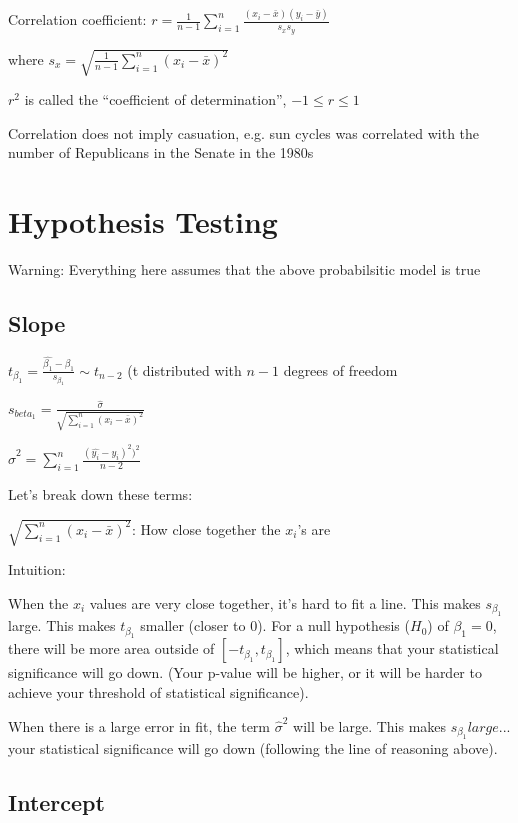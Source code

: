 \documentclass[twoside]{article}
\begin{document}
Correlation coefficient: $r = \frac{1}{n-1}\sum\limits_{i=1}^{n}\frac{(x_i - \bar{x})(y_i-\bar{y})}{s_x s_y}$

where $s_x = \sqrt{\frac{1}{n-1} \sum\limits_{i=1}^n(x_i-\bar{x})^2}$

$r^2$ is called the ``coefficient of determination'', $-1 \leq r \leq 1$

Correlation does not imply casuation, e.g. sun cycles was correlated with the number of Republicans in the Senate in the 1980s

\section{Hypothesis Testing}

Warning: Everything here assumes that the above probabilsitic model is true

\subsection{Slope}
$t_{\beta_1} = \frac{\hat{\beta_1} - \beta_1}{s_{\beta_1}} \sim t_{n-2}$ (t distributed with $n-1$ degrees of freedom

$s_{beta_1} = \frac{\hat{\sigma}}{\sqrt{\sum\limits_{i=1}^n (x_i - \bar{x})^2}}$

$\hat{\sigma}^2 = \sum\limits_{i=1}^n \frac{(\hat{y_i} - y_i)^2)^2}{n-2}$

Let's break down these terms:

${\sqrt{\sum\limits_{i=1}^n (x_i - \bar{x})^2}}$: How close together the $x_i$'s are

Intuition:

When the $x_i$ values are very close together, it's hard to fit a line. This makes $s_{\beta_1}$ large. This makes $t_{\beta_1}$ smaller (closer to 0). For a null hypothesis ($H_0$) of $\beta_1 = 0$, there will be more area outside of $[-t_{\beta_1},t_{\beta_1}]$, which means that your statistical significance will go down. (Your p-value will be higher, or it will be harder to achieve your threshold of statistical significance).

When there is a large error in fit, the term $\hat{\sigma}^2$ will be large. This makes $s_{\beta_1} large$... your statistical significance will go down (following the line of reasoning above).

\subsection{Intercept}
\end{document}
